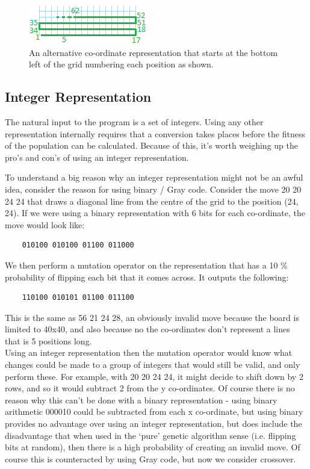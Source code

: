 \documentclass[]{report}
\begin{document}
\begin{figure}
	\centering
	\includegraphics{figures/alternativeRepresentation.png}
	\caption{An alternative co-ordinate representation that starts at the bottom left of the grid numbering each position as shown.}
	\label{alternativePositioning}
\end{figure}

\subsection{Integer Representation}

The natural input to the program is a set of integers. Using any other representation internally requires that a conversion takes places before the fitness of the population can be calculated. Because of this, it's worth weighing up the pro's and con's of using an integer representation.

To understand a big reason why an integer representation might not be an awful idea, consider the reason for using binary / Gray code. Consider the move 20 20 24 24 that draws a diagonal line from the centre of the grid to the position (24, 24). If we were using a binary representation with 6 bits for each co-ordinate, the move would look like:

\begin{center}
\begin{verbatim}
	010100 010100 01100 011000
\end{verbatim}
\end{center}

We then perform a mutation operator on the representation that has a 10 \% probability of flipping each bit that it comes across. It outputs the following:

\begin{verbatim}
	110100 010101 01100 011100
\end{verbatim}

This is the same as 56 21 24 28, an obviously invalid move because the board is limited to 40x40, and also because no the co-ordinates don't represent a lines that is 5 positions long. \\

Using an integer representation then the mutation operator would know what changes could be made to a group of integers that would still be valid, and only perform these. For example, with 20 20 24 24, it might decide to shift down by 2 rows, and so it would subtract 2 from the y co-ordinates. Of course there is no reason why this can't be done with a binary representation - using binary arithmetic 000010 could be subtracted from each x co-ordinate, but using binary provides no advantage over using an integer representation, but does include the disadvantage that when used in the `pure' genetic algorithm sense (i.e. flipping bits at random), then there is a high probability of creating an invalid move. Of course this is counteracted by using Gray code, but now we consider crossover. \\
\end{document}
